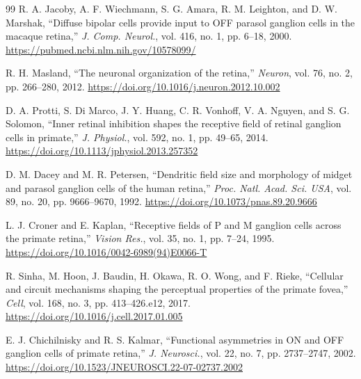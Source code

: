 \documentclass[a4paper,10pt,twocolumn,uplatex,dvipdfmx]{jsarticle}
\begin{document}
\begin{thebibliography}{99}
R. A. Jacoby, A. F. Wiechmann, S. G. Amara, R. M. Leighton, and D. W. Marshak,
``Diffuse bipolar cells provide input to OFF parasol ganglion cells in the
macaque retina,''
\textit{J. Comp. Neurol.}, vol. 416, no. 1, pp. 6--18, 2000.
\url{https://pubmed.ncbi.nlm.nih.gov/10578099/}

R. H. Masland,
``The neuronal organization of the retina,''
\textit{Neuron}, vol. 76, no. 2, pp. 266--280, 2012.
\url{https://doi.org/10.1016/j.neuron.2012.10.002}

D. A. Protti, S. Di Marco, J. Y. Huang, C. R. Vonhoff,
V. A. Nguyen, and S. G. Solomon,
``Inner retinal inhibition shapes the receptive field of retinal ganglion
cells in primate,''
\textit{J. Physiol.}, vol. 592, no. 1, pp. 49--65, 2014.
\url{https://doi.org/10.1113/jphysiol.2013.257352}

D. M. Dacey and M. R. Petersen,
``Dendritic field size and morphology of midget and parasol ganglion cells
of the human retina,''
\textit{Proc. Natl. Acad. Sci. USA}, vol. 89, no. 20, pp. 9666--9670, 1992.
\url{https://doi.org/10.1073/pnas.89.20.9666}

L. J. Croner and E. Kaplan,
``Receptive fields of P and M ganglion cells across the primate retina,''
\textit{Vision Res.}, vol. 35, no. 1, pp. 7--24, 1995.
\url{https://doi.org/10.1016/0042-6989(94)E0066-T}

R. Sinha, M. Hoon, J. Baudin, H. Okawa, R. O. Wong, and F. Rieke,
``Cellular and circuit mechanisms shaping the perceptual properties of the
primate fovea,''
\textit{Cell}, vol. 168, no. 3, pp. 413--426.e12, 2017.
\url{https://doi.org/10.1016/j.cell.2017.01.005}

E. J. Chichilnisky and R. S. Kalmar,
``Functional asymmetries in ON and OFF ganglion cells of primate retina,''
\textit{J. Neurosci.}, vol. 22, no. 7, pp. 2737--2747, 2002.
\url{https://doi.org/10.1523/JNEUROSCI.22-07-02737.2002}

\end{thebibliography}
\end{document}
